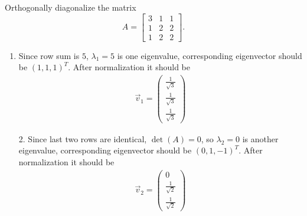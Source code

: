 \documentclass[pdf,9pt]{beamer}
\begin{document}
\begin{frame}[fragile]
    \begin{problem}
  Orthogonally diagonalize the matrix
  \[ A=\left[\begin{array}{rrr}
      3 & 1 & 1 \\
      1 & 2 & 2 \\
      1 & 2 & 2
  \end{array}\right].\]
\end{problem}
\vfill
\pause
\begin{solution}
    \begin{enumerate}
	\item Since row sum is $5$, $\lambda_1=5$ is one eigenvalue, corresponding
	    eigenvector should be $(1,1,1)^T$. After normalization it should be
	    \begin{align*}
		\vec{v}_1=
		\begin{pmatrix}
		   \frac{1}{\sqrt{3}}\\
		   \frac{1}{\sqrt{3}}\\
		   \frac{1}{\sqrt{3}}
		\end{pmatrix}
	    \end{align*}
    \end{enumerate}
\end{solution}
\end{frame}
\begin{frame}[fragile]
    \begin{solution}[continued]
   \begin{enumerate}
       \item[2.] Since last two rows are identical, $\det(A)=0$, so $\lambda_2=0$
	   is another eigenvalue, corresponding eigenvector should be
	   $(0,1,-1)^T$. After normalization it should be
	   \begin{align*}
	       \vec{v}_2 =
		\begin{pmatrix}
        0 		  \\
        \frac{1}{\sqrt{2}}\\
        \frac{1}{\sqrt{2}}
		\end{pmatrix}
	   \end{align*}
   \end{enumerate}
   \end{solution}
\end{frame}
\end{document}
